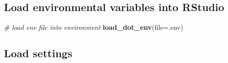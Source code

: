 \documentclass[
]{book}
\newenvironment{Shaded}{\begin{snugshade}}{\end{snugshade}}
\newcommand{\AttributeTok}[1]{\textcolor[rgb]{0.13,0.29,0.53}{#1}}
\newcommand{\CommentTok}[1]{\textcolor[rgb]{0.56,0.35,0.01}{\textit{#1}}}
\newcommand{\FunctionTok}[1]{\textcolor[rgb]{0.13,0.29,0.53}{\textbf{#1}}}
\newcommand{\NormalTok}[1]{#1}
\newcommand{\StringTok}[1]{\textcolor[rgb]{0.31,0.60,0.02}{#1}}
\begin{document}
\subsection{Load environmental variables into RStudio}\label{load-environmental-variables-into-rstudio}

\begin{Shaded}
\begin{Highlighting}[]
\CommentTok{\# load env file into environment}
\FunctionTok{load\_dot\_env}\NormalTok{(}\AttributeTok{file=}\StringTok{\textquotesingle{}.env\textquotesingle{}}\NormalTok{)}
\end{Highlighting}
\end{Shaded}

\subsection{Load settings}\label{load-settings}
\end{document}
